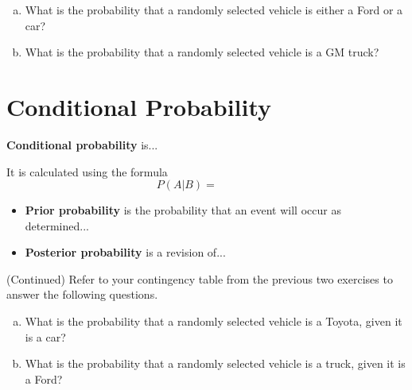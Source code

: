 \documentclass[12pt, letterpaper]{article}
\newcounter{exercise}
\theoremstyle{definition}
\begin{document}
\begin{enumerate}[(a)]

\item What is the probability that a randomly selected vehicle is either a Ford or a car?

\vfill

\item What is the probability that a randomly selected vehicle is a GM truck?

\vfill

\end{enumerate}


\newpage

\section*{Conditional Probability}

\begin{defn}
\textbf{Conditional probability} is...
\vspace*{1in}

It is calculated using the formula
$$ P(A|B) = ~~~~~~~~~~~~~~~~ $$
\end{defn}


\begin{defn}
\begin{itemize}

\item \textbf{Prior probability} is the probability that an event will occur as determined...
\vspace*{.7in}


\item \textbf{Posterior probability} is a revision of...
\vspace*{.7in}

\end{itemize}
\end{defn}


\begin{exercise} (Continued)
Refer to your contingency table from the previous two exercises to answer the following questions.
\end{exercise}

\begin{enumerate}[(a)]
\item What is the probability that a randomly selected vehicle is a Toyota, given it is a car?

\vfill

\item What is the probability that a randomly selected vehicle is a truck, given it is a Ford?

\vfill

\end{enumerate}
\end{document}

